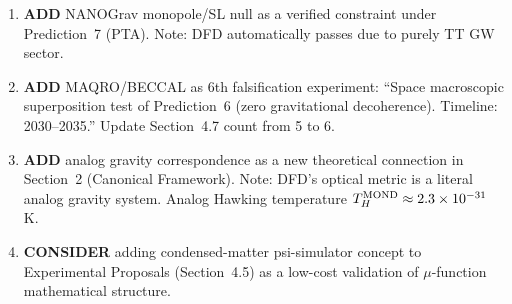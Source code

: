 \documentclass[11pt]{article}
\newcommand{\ee}[1]{\times 10^{#1}}
\begin{document}
\begin{enumerate}
\item \textbf{ADD} NANOGrav monopole/SL null as a verified constraint
  under Prediction~7 (PTA). Note: DFD automatically passes due to
  purely TT GW sector.
\item \textbf{ADD} MAQRO/BECCAL as 6th falsification experiment:
  ``Space macroscopic superposition test of Prediction~6 (zero
  gravitational decoherence). Timeline: 2030--2035.'' Update
  Section~4.7 count from 5 to 6.
\item \textbf{ADD} analog gravity correspondence as a new theoretical
  connection in Section~2 (Canonical Framework). Note: DFD's optical
  metric is a literal analog gravity system. Analog Hawking temperature
  $T_H^{\rm MOND} \approx 2.3\ee{-31}\,$K.
\item \textbf{CONSIDER} adding condensed-matter psi-simulator concept
  to Experimental Proposals (Section~4.5) as a low-cost validation of
  $\mu$-function mathematical structure.
\end{enumerate}
\end{document}
